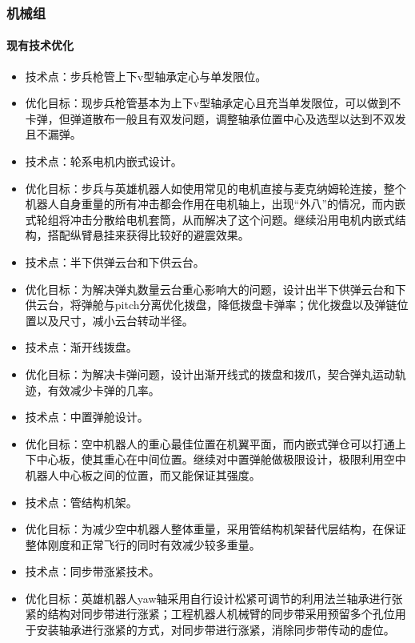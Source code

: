 \subsubsection{机械组}

    \paragraph{现有技术优化}

    
        \begin{itemize}
            \item 技术点：步兵枪管上下v型轴承定心与单发限位。
            \item 优化目标：现步兵枪管基本为上下v型轴承定心且充当单发限位，可以做到不卡弹，但弹道散布一般且有双发问题，调整轴承位置中心及选型以达到不双发且不漏弹。
            \item 技术点：轮系电机内嵌式设计。
            \item 优化目标：步兵与英雄机器人如使用常见的电机直接与麦克纳姆轮连接，整个机器人自身重量的所有冲击都会作用在电机轴上，出现“外八”的情况，而内嵌式轮组将冲击分散给电机套筒，从而解决了这个问题。继续沿用电机内嵌式结构，搭配纵臂悬挂来获得比较好的避震效果。
            \item 技术点：半下供弹云台和下供云台。
            \item 优化目标：为解决弹丸数量云台重心影响大的问题，设计出半下供弹云台和下供云台，将弹舱与pitch分离优化拨盘，降低拨盘卡弹率；优化拨盘以及弹链位置以及尺寸，减小云台转动半径。
            \item 技术点：渐开线拨盘。
            \item 优化目标：为解决卡弹问题，设计出渐开线式的拨盘和拨爪，契合弹丸运动轨迹，有效减少卡弹的几率。
            \item 技术点：中置弹舱设计。
            \item 优化目标：空中机器人的重心最佳位置在机翼平面，而内嵌式弹仓可以打通上下中心板，使其重心在中间位置。继续对中置弹舱做极限设计，极限利用空中机器人中心板之间的位置，而又能保证其强度。
            \item 技术点：管结构机架。
            \item 优化目标：为减少空中机器人整体重量，采用管结构机架替代层结构，在保证整体刚度和正常飞行的同时有效减少较多重量。
            \item 技术点：同步带涨紧技术。
            \item 优化目标：英雄机器人yaw轴采用自行设计松紧可调节的利用法兰轴承进行张紧的结构对同步带进行涨紧；工程机器人机械臂的同步带采用预留多个孔位用于安装轴承进行涨紧的方式，对同步带进行涨紧，消除同步带传动的虚位。

\end{itemize}
